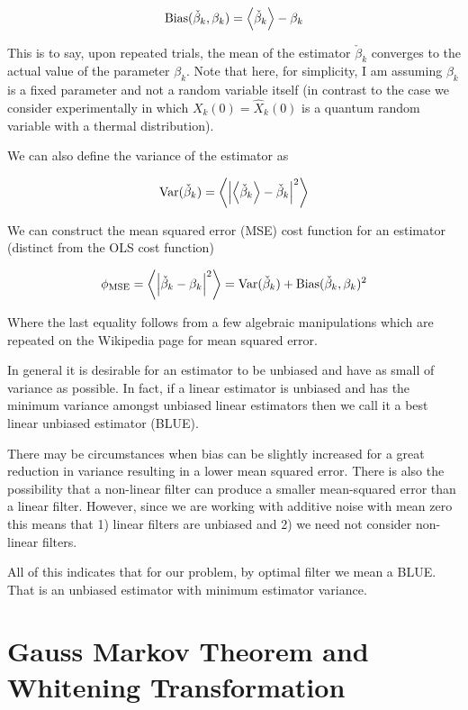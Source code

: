 \documentclass[12pt]{article}
\begin{document}
\begin{align}
\text{Bias}(\check{\beta}_k, \beta_k) = \Braket{\check{\beta}_k} - \beta_k
\end{align}

This is to say, upon repeated trials, the mean of the estimator $\check{\beta}_k$ converges to the actual value of the parameter $\beta_k$. Note that here, for simplicity, I am assuming $\beta_k$ is a fixed parameter and not a random variable itself (in contrast to the case we consider experimentally in which $X_k(0) = \hat{X}_k(0)$ is a quantum random variable with a thermal distribution).

We can also define the variance of the estimator as

\begin{align}
\text{Var}(\check{\beta}_k) = \Braket{\left\lvert \Braket{\check{\beta}_k} - \check{\beta}_k \right\rvert^2}
\end{align}

We can construct the mean squared error (MSE) cost function for an estimator (distinct from the OLS cost function)

\begin{align}
\phi_{\text{MSE}} = \Braket{\left\lvert \check{\beta}_k - \beta_k \right\rvert^2} = \text{Var}(\check{\beta}_k) + \text{Bias}(\check{\beta}_k,\beta_k)^2
\end{align}

Where the last equality follows from a few algebraic manipulations which are repeated on the Wikipedia page for mean squared error.

In general it is desirable for an estimator to be unbiased and have as small of variance as possible. In fact, if a linear estimator is unbiased and has the minimum variance amongst unbiased linear estimators then we call it a best linear unbiased estimator (BLUE). 

There may be circumstances when bias can be slightly increased for a great reduction in variance resulting in a lower mean squared error. There is also the possibility that a non-linear filter can produce a smaller mean-squared error than a linear filter. However, since we are working with additive noise with mean zero this means that 1) linear filters are unbiased and 2) we need not consider non-linear filters. 

All of this indicates that for our problem, by optimal filter we mean a BLUE. That is an unbiased estimator with minimum estimator variance.


\section{Gauss Markov Theorem and Whitening Transformation}
\end{document}
